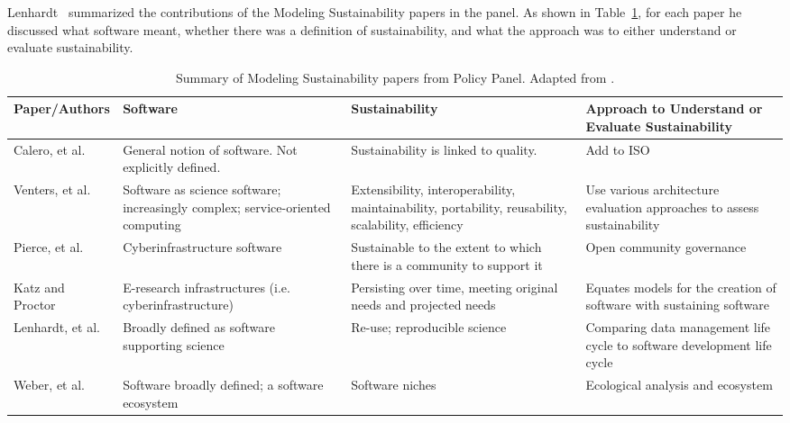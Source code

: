 \documentclass[11pt, oneside]{amsart}
\begin{document}
Lenhardt~\cite{lenhardt-wssspe1-panel} summarized the contributions of the Modeling
Sustainability papers in the panel.
As shown in Table~\ref{tab:defining-sustainability}, for each paper he
discussed what software meant, whether there was a definition of sustainability, and
what the approach was to either understand or evaluate sustainability.

\begin{table}[t]
  \begin{scriptsize}
    \begin{center}
      \caption{Summary of Modeling Sustainability papers from Policy Panel.  Adapted from \cite{lenhardt-wssspe1-panel}.}
      \label{tab:defining-sustainability}
      \begin{tabular}{|p{2.3cm}|p{3.6cm}|p{4.4cm}|p{4.8cm}|}
                \hline
{\bf Paper/Authors}
& {\bf Software}
& {\bf Sustainability}
& {\bf Approach to Understand or Evaluate Sustainability} \\
                \hline
Calero, et al. \cite{Calero_WSSSPE}
& General notion of software. Not explicitly defined.
& Sustainability is linked to quality.
& Add to ISO \\
                \hline
Venters, et al. \cite{Venters_WSSSPE}
& Software as science software; increasingly complex; service-oriented computing
& Extensibility, interoperability, maintainability, portability, reusability, scalability, efficiency
& Use various architecture evaluation approaches to assess sustainability \\
                \hline
Pierce, et al. \cite{Pierce_WSSSPE}
& Cyberinfrastructure software
& Sustainable to the extent to which there is a community to support it
& Open community governance \\
                \hline
Katz and Proctor \cite{Katz_WSSSPE}
& E-research infrastructures (i.e. cyberinfrastructure)
& Persisting over time, meeting original needs and projected needs
& Equates models for the creation of software with sustaining software \\
                \hline
Lenhardt, et al. \cite{Lenhardt_WSSSPE}
& Broadly defined as software supporting science
& Re-use; reproducible science
& Comparing data management life cycle to software development life cycle \\
                \hline
Weber, et al. \cite{Weber_WSSSPE}
& Software broadly defined; a software ecosystem
& Software niches
& Ecological analysis and ecosystem \\
                \hline
     \end{tabular}
    \end{center}
  \end{scriptsize}
\end{table}
\end{document}
